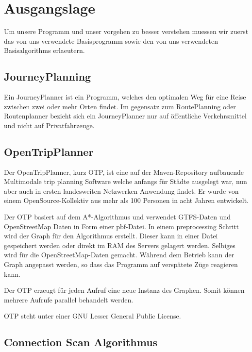 \section{Ausgangslage}
Um unsere Programm und unser vorgehen zu besser verstehen muessen wir zuerst das von uns verwendete Basisprogramm sowie den von uns verwendeten Basisalgorithms erlaeutern.

\subsection{JourneyPlanning}
Ein JourneyPlanner ist ein Programm, welches den optimalen Weg für eine Reise zwischen zwei oder mehr Orten findet. Im gegensatz zum RoutePlanning oder Routenplanner bezieht sich ein JourneyPlanner nur auf öffentliche Verkehrsmittel und nicht auf Privatfahrzeuge.

\subsection{OpenTripPlanner}

Der OpenTripPlanner, kurz OTP, ist eine auf der Maven-Repository %
aufbauende Multimodale trip planning Software welche anfangs für Städte ausgelegt war, nun aber auch in ersten landesweiten Netzwerken Anwendung findet. Er wurde von einem OpenSource-Kollektiv aus mehr als 100 Personen in acht Jahren entwickelt. %

Der OTP basiert auf dem A*-Algorithmus und verwendet GTFS-Daten und OpenStreetMap Daten in Form einer pbf-Datei. In einem preprocessing Schritt wird der Graph für den Algorithmus erstellt. Dieser kann in einer Datei gespeichert werden oder direkt im RAM des Servers gelagert werden. Selbiges wird für die OpenStreetMap-Daten gemacht. Während dem Betrieb kann der Graph angepasst werden, so dass das Programm auf verspätete Züge reagieren kann. %

Der OTP erzeugt für jeden Aufruf eine neue Instanz des Graphen. Somit können mehrere Aufrufe parallel behandelt werden.

OTP steht unter einer GNU Lesser General Public License. 





\subsection{Connection Scan Algorithmus}
 

